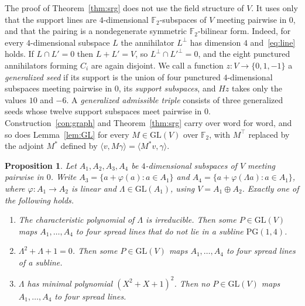 \documentclass[11pt]{amsart}
\newtheorem{proposition}[theorem]{Proposition}
\theoremstyle{definition}
\newcommand{\F}{\mathbb{F}}
\newcommand{\PG}{\mathrm{PG}}
\newcommand{\GL}{\mathrm{GL}}
\begin{document}
The proof of Theorem~\ref{thm:srg} does not use the field structure of $V$. It uses only that the support lines are $4$-dimensional $\F_2$-subspaces of $V$ meeting pairwise in $0$, and that the pairing is a nondegenerate symmetric $\F_2$-bilinear form. Indeed, for every $4$-dimensional subspace $L$ the annihilator $L^\perp$ has dimension $4$ and~\eqref{eq:line} holds. If $L\cap L'=0$ then $L+L'=V$, so $L^\perp\cap L'^\perp=0$, and the eight punctured annihilators forming $C_i$ are again disjoint. We call a function $z\colon V\to\{0,1,-1\}$ a \emph{generalized seed} if its support is the union of four punctured $4$-dimensional subspaces meeting pairwise in $0$, its \emph{support subspaces}, and $Hz$ takes only the values $10$ and $-6$. A \emph{generalized admissible triple} consists of three generalized seeds whose twelve support subspaces meet pairwise in $0$. Construction~\ref{con:graph} and Theorem~\ref{thm:srg} carry over word for word, and so does Lemma~\ref{lem:GL} for every $M\in\GL(V)$ over $\F_2$, with $M^\top$ replaced by the adjoint $M^*$ defined by $\langle v,M\gamma\rangle=\langle M^*v,\gamma\rangle$.

\begin{proposition}\label{prop:types}
Let $A_1,A_2,A_3,A_4$ be $4$-dimensional subspaces of $V$ meeting pairwise in $0$. Write $A_3=\{a+\varphi(a):a\in A_1\}$ and $A_4=\{a+\varphi(\Lambda a):a\in A_1\}$, where $\varphi\colon A_1\to A_2$ is linear and $\Lambda\in\GL(A_1)$, using $V=A_1\oplus A_2$. Exactly one of the following holds.
\begin{enumerate}
\item[(a)] The characteristic polynomial of $\Lambda$ is irreducible. Then some $P\in\GL(V)$ maps $A_1,\dots,A_4$ to four spread lines that do not lie in a subline $\PG(1,4)$.
\item[(b)] $\Lambda^2+\Lambda+1=0$. Then some $P\in\GL(V)$ maps $A_1,\dots,A_4$ to four spread lines of a subline.
\item[(c)] $\Lambda$ has minimal polynomial $(X^2+X+1)^2$. Then no $P\in\GL(V)$ maps $A_1,\dots,A_4$ to four spread lines.
\end{enumerate}
\end{proposition}
\end{document}
